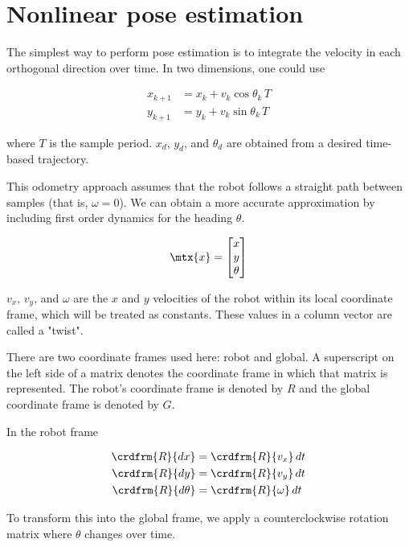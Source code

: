 \section{Nonlinear pose estimation}

The simplest way to perform pose estimation is to integrate the velocity in each
orthogonal direction over time. In two dimensions, one could use

\begin{align*}
  x_{k+1} &= x_k + v_k\cos\theta_k\,T \\
  y_{k+1} &= y_k + v_k\sin\theta_k\,T
\end{align*}

where $T$ is the sample period. $x_d$, $y_d$, and $\theta_d$ are obtained from a
desired time-based trajectory.

This odometry approach assumes that the robot follows a straight path between
samples (that is, $\omega = 0$). We can obtain a more accurate approximation by
including first order dynamics for the heading $\theta$.

\begin{equation*}
  \mtx{x} = \begin{bmatrix}
    x \\
    y \\
    \theta
  \end{bmatrix}
\end{equation*}

$v_x$, $v_y$, and $\omega$ are the $x$ and $y$ velocities of the robot within
its local coordinate frame, which will be treated as constants. These values in
a column vector are called a "twist".

\begin{remark}
  There are two coordinate frames used here: robot and global. A superscript on
  the left side of a matrix denotes the coordinate frame in which that matrix is
  represented. The robot's coordinate frame is denoted by $R$ and the global
  coordinate frame is denoted by $G$.
\end{remark}

In the robot frame

\begin{align*}
  \crdfrm{R}{dx} &= \crdfrm{R}{v_x} \,dt \\
  \crdfrm{R}{dy} &= \crdfrm{R}{v_y} \,dt \\
  \crdfrm{R}{d\theta} &= \crdfrm{R}{\omega} \,dt
\end{align*}

To transform this into the global frame, we apply a counterclockwise rotation
matrix where $\theta$ changes over time.

